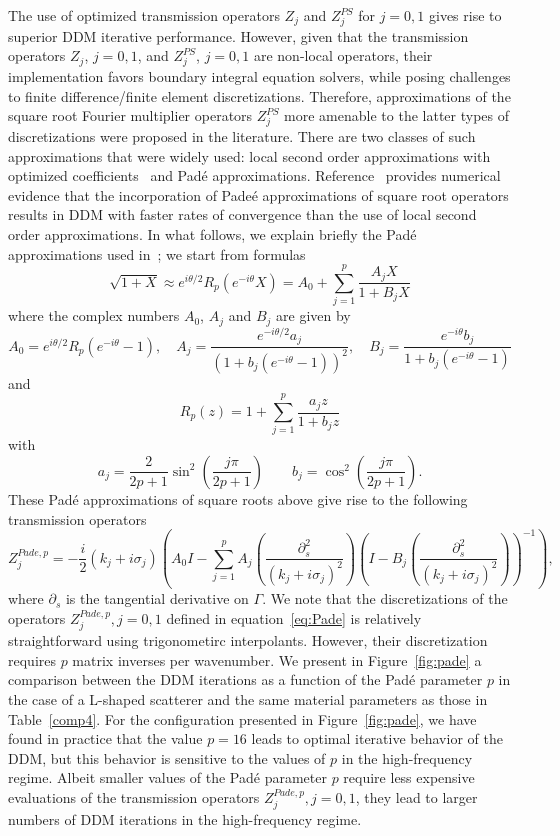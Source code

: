 \documentclass[11pt]{article}
\numberwithin{equation}{section}
\begin{document}
The use of optimized transmission operators $Z_j$ and $Z_j^{PS}$ for $j=0,1$ gives rise to superior DDM iterative performance. However, given that the transmission operators $Z_j$, $j=0,1$, and $Z_j^{PS}$, $j=0,1$ are non-local operators, their implementation favors boundary integral equation solvers, while posing challenges to finite difference/finite element discretizations. Therefore, approximations of the square root Fourier multiplier operators $Z_j^{PS}$ more amenable to the latter types of discretizations were proposed in the literature. There are two classes of such approximations that were widely used: local second order approximations with optimized coefficients~\cite{Gander1} and Pad\'e approximations. Reference~\cite{boubendirDDM} provides numerical evidence that the incorporation of Pade\'e approximations of square root operators results in DDM with faster rates of convergence than the use of local second order approximations. In what follows, we explain briefly the Pad\'e approximations used in~\cite{boubendirDDM}; we start from formulas
\[
\sqrt{1+X}\approx e^{i\theta/2}R_p(e^{-i\theta}X)=A_0+\sum_{j=1}^p\frac{A_jX}{1+B_jX}
\]
where the complex numbers $A_0$, $A_j$ and $B_j$ are given by
\[
A_0=e^{i\theta/2}R_p(e^{-i\theta}-1),\quad A_j=\frac{e^{-i\theta/2}a_j}{(1+b_j(e^{-i\theta}-1))^2},\quad B_j=\frac{e^{-i\theta}b_j}{1+b_j(e^{-i\theta}-1)}
\]
and
\[
R_p(z)=1+\sum_{j=1}^p\frac{a_j z}{1+b_j z}
\]
with
\[
a_j=\frac{2}{2p+1}\sin^2(\frac{j\pi}{2p+1})\qquad b_j=\cos^2(\frac{j\pi}{2p+1}).
\]
These Pad\'e approximations of square roots above give rise to the following transmission operators
\begin{equation}\label{eq:Pade}
  Z_j^{Pade,p}=-\frac{i}{2}(k_j+i\sigma_j)\left(A_0I-\sum_{j=1}^pA_j\left(\frac{\partial_s^2}{(k_j+i\sigma_j)^2}\right)\left(I-B_j\left(\frac{\partial_s^2}{(k_j+i\sigma_j)^2}\right)\right)^{-1}\right),
\end{equation}
where $\partial_s$ is the tangential derivative on $\Gamma$. We note that the discretizations of the operators $Z_j^{Pade,p},j=0,1$ defined in equation~\eqref{eq:Pade} is relatively straightforward using trigonometirc interpolants. However, their discretization requires $p$ matrix inverses per wavenumber. We present in Figure~\ref{fig:pade} a comparison between the DDM iterations as a function of the Pad\'e parameter $p$ in the case of a L-shaped scatterer and the same material parameters as those in Table~\ref{comp4}. For the configuration presented in  Figure~\ref{fig:pade}, we have found in practice that the value $p=16$ leads to optimal iterative behavior of the DDM, but this behavior is sensitive to the values of $p$ in the high-frequency regime. Albeit smaller values of the Pad\'e parameter $p$ require less expensive evaluations of the transmission operators $Z_j^{Pade,p},j=0,1$, they lead to larger numbers of DDM iterations in the high-frequency regime. 
\end{document}
